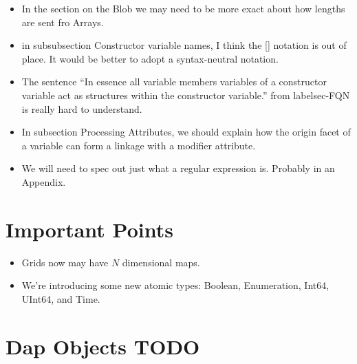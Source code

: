 \documentclass[justify]{dods-paper}
\begin{document}
\begin{itemize}
\item In the section on the Blob we may need to be more exact about
  how lengths are sent fro Arrays.

\item in subsubsection Constructor variable names, I think the []
  notation is out of place. It would be better to adopt a
  syntax-neutral notation.

\item The sentence ``In essence all variable members variables of a
constructor variable act as \Attribute structures within the
constructor variable.'' from label{sec-FQN} is really hard to
understand.

\item In subsection Processing Attributes, we should explain how the
  origin facet of a variable can form a linkage with a modifier
  attribute.

\item We will need to spec out just what a regular expression
  is. Probably in an Appendix.

\end{itemize}

\section{Important Points}
\begin{itemize}
\item Grids now may have $N$ dimensional maps.
\item We're introducing some new atomic types: Boolean, Enumeration, Int64,
  UInt64, and Time.
\end{itemize}

\section{Dap Objects TODO}
 
\end{document}
